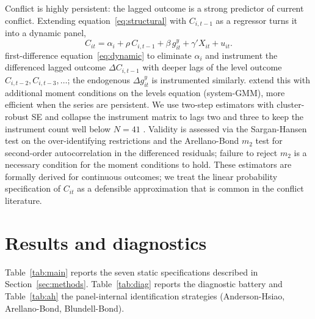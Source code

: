 \documentclass[11pt,a4paper]{article}
\begin{document}
Conflict is highly persistent: the lagged outcome is a strong predictor
of current conflict. Extending equation~\eqref{eq:structural} with
$C_{i,t-1}$ as a regressor turns it into a dynamic panel,
\begin{equation}
C_{it} = \alpha_i + \rho\, C_{i,t-1} + \beta\, g^{y}_{it}
       + \gamma' X_{it} + u_{it}.
\label{eq:dynamic}
\end{equation}
\citet{ArellanoBond1991} first-difference equation~\eqref{eq:dynamic}
to eliminate $\alpha_i$ and instrument the differenced lagged outcome
$\Delta C_{i,t-1}$ with deeper lags of the level outcome $C_{i,t-2},
C_{i,t-3}, \ldots$; the endogenous $\Delta g^{y}_{it}$ is instrumented
similarly. \citet{BlundellBond1998} extend this with additional moment
conditions on the levels equation (system-GMM), more efficient when
the series are persistent. We use two-step estimators with
cluster-robust SE and collapse the instrument matrix to lags two and
three to keep the instrument count well below $N = 41$
\citep{Roodman2009}. Validity is assessed via the Sargan-Hansen test
on the over-identifying restrictions and the Arellano-Bond $m_2$ test
for second-order autocorrelation in the differenced residuals; failure
to reject $m_2$ is a necessary condition for the moment conditions to
hold. These estimators are formally derived for continuous outcomes;
we treat the linear probability specification of $C_{it}$ as a
defensible approximation that is common in the conflict literature.

\section{Results and diagnostics}\label{sec:results}
Table~\ref{tab:main} reports the seven static specifications described
in Section~\ref{sec:methods}. Table~\ref{tab:diag} reports the
diagnostic battery and Table~\ref{tab:ah} the panel-internal
identification strategies (Anderson-Hsiao, Arellano-Bond,
Blundell-Bond).
\end{document}
